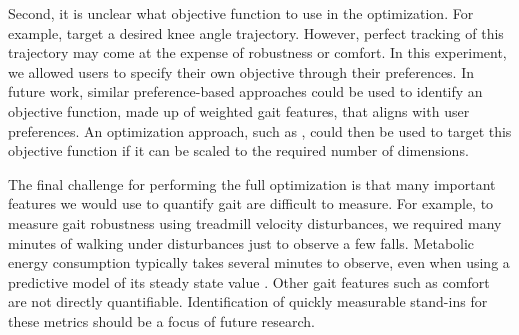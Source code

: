 Second, it is unclear what objective function to use in the optimization. For
example, \citet{wen2019online} target a desired knee angle trajectory. However,
perfect tracking of this trajectory may come at the expense of robustness or
comfort. In this experiment, we allowed users to specify their own objective
through their preferences. In future work, similar preference-based approaches
could be used to identify an objective function, made up of weighted gait
features, that aligns with user preferences.  An optimization approach, such as
\citet{wen2019online}, could then be used to target this objective function if
it can be scaled to the required number of dimensions.

The final challenge for performing the full optimization is that many important
features we would use to quantify gait are difficult to measure. For example, to
measure gait robustness using treadmill velocity disturbances, we required many
minutes of walking under disturbances just to observe a few falls. Metabolic
energy consumption typically takes several minutes to observe, even when using a
predictive model of its steady state value \citep{zhang2017human}. Other gait
features such as comfort are not directly quantifiable. Identification of
quickly measurable stand-ins for these metrics should be a focus of future
research.
